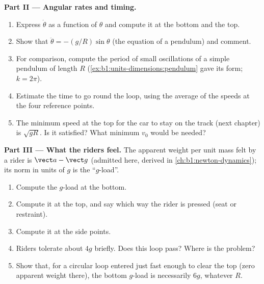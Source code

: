 \begin{problem}
\medskip
\noindent\textbf{Part II --- Angular rates and timing.}
\begin{enumerate}[resume]
  \item Express $\dot\theta$ as a function of $\theta$ and compute it
        at the bottom and the top.
  \item Show that $\ddot\theta = -(g/R)\sin\theta$ (the equation of a
        pendulum) and comment.
  \item For comparison, compute the period of small oscillations of a
        simple pendulum of length $R$ (\cref{ex:b1:units-dimensions:pendulum}
        gave its form; $k = 2\pi$).
  \item Estimate the time to go round the loop, using the average of
        the speeds at the four reference points.
  \item The minimum speed at the top for the car to stay on the track
        (next chapter) is $\sqrt{gR}$. Is it satisfied? What minimum
        $v_0$ would be needed?
\end{enumerate}

\medskip
\noindent\textbf{Part III --- What the riders feel.}
The apparent weight per unit mass felt by a rider is $\vect a - \vect g$
(admitted here, derived in \cref{ch:b1:newton-dynamics}); its norm in
units of $g$ is the ``$g$-load''.
\begin{enumerate}[resume]
  \item Compute the $g$-load at the bottom.
  \item Compute it at the top, and say which way the rider is pressed
        (seat or restraint).
  \item Compute it at the side points.
  \item Riders tolerate about $4g$ briefly. Does this loop pass? Where
        is the problem?
  \item Show that, for a circular loop entered just fast enough to
        clear the top (zero apparent weight there), the bottom $g$-load
        is necessarily $6g$, whatever $R$.
\end{enumerate}


\end{problem}
